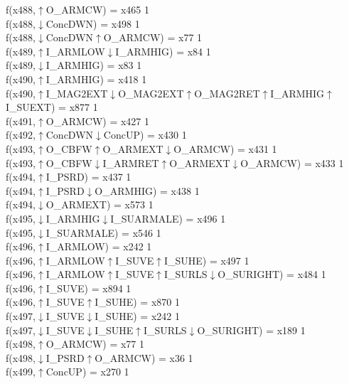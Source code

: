 f(x488,$\uparrow$O\_ARMCW) = x465 {1} \\
f(x488,$\downarrow$ConcDWN) = x498 {1} \\
f(x488,$\downarrow$ConcDWN$\uparrow$O\_ARMCW) = x77 {1} \\
f(x489,$\uparrow$I\_ARMLOW$\downarrow$I\_ARMHIG) = x84 {1} \\
f(x489,$\downarrow$I\_ARMHIG) = x83 {1} \\
f(x490,$\uparrow$I\_ARMHIG) = x418 {1} \\
f(x490,$\uparrow$I\_MAG2EXT$\downarrow$O\_MAG2EXT$\uparrow$O\_MAG2RET$\uparrow$I\_ARMHIG$\uparrow$I\_SUEXT) = x877 {1} \\
f(x491,$\uparrow$O\_ARMCW) = x427 {1} \\
f(x492,$\uparrow$ConcDWN$\downarrow$ConcUP) = x430 {1} \\
f(x493,$\uparrow$O\_CBFW$\uparrow$O\_ARMEXT$\downarrow$O\_ARMCW) = x431 {1} \\
f(x493,$\uparrow$O\_CBFW$\downarrow$I\_ARMRET$\uparrow$O\_ARMEXT$\downarrow$O\_ARMCW) = x433 {1} \\
f(x494,$\uparrow$I\_PSRD) = x437 {1} \\
f(x494,$\uparrow$I\_PSRD$\downarrow$O\_ARMHIG) = x438 {1} \\
f(x494,$\downarrow$O\_ARMEXT) = x573 {1} \\
f(x495,$\downarrow$I\_ARMHIG$\downarrow$I\_SUARMALE) = x496 {1} \\
f(x495,$\downarrow$I\_SUARMALE) = x546 {1} \\
f(x496,$\uparrow$I\_ARMLOW) = x242 {1} \\
f(x496,$\uparrow$I\_ARMLOW$\uparrow$I\_SUVE$\uparrow$I\_SUHE) = x497 {1} \\
f(x496,$\uparrow$I\_ARMLOW$\uparrow$I\_SUVE$\uparrow$I\_SURLS$\downarrow$O\_SURIGHT) = x484 {1} \\
f(x496,$\uparrow$I\_SUVE) = x894 {1} \\
f(x496,$\uparrow$I\_SUVE$\uparrow$I\_SUHE) = x870 {1} \\
f(x497,$\downarrow$I\_SUVE$\downarrow$I\_SUHE) = x242 {1} \\
f(x497,$\downarrow$I\_SUVE$\downarrow$I\_SUHE$\uparrow$I\_SURLS$\downarrow$O\_SURIGHT) = x189 {1} \\
f(x498,$\uparrow$O\_ARMCW) = x77 {1} \\
f(x498,$\downarrow$I\_PSRD$\uparrow$O\_ARMCW) = x36 {1} \\
f(x499,$\uparrow$ConcUP) = x270 {1} \\
